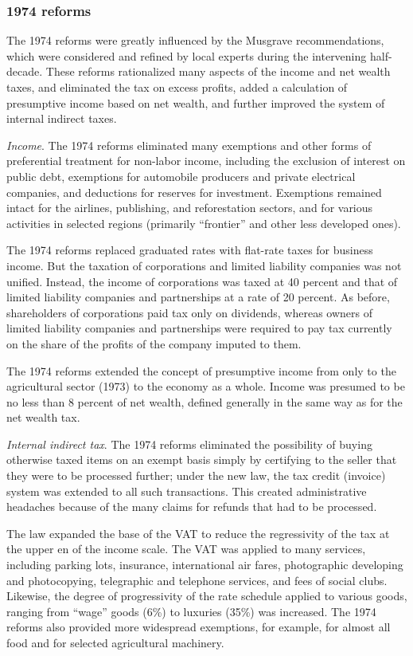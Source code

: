 \documentclass[
  12pt]{article}
\theoremstyle{definition}
\theoremstyle{remark}
\begin{document}
\subsubsection{1974 reforms}\label{reforms}

The 1974 reforms were greatly influenced by the Musgrave
recommendations, which were considered and refined by local experts
during the intervening half-decade. These reforms rationalized many
aspects of the income and net wealth taxes, and eliminated the tax on
excess profits, added a calculation of presumptive income based on net
wealth, and further improved the system of internal indirect taxes.

\emph{Income}. The 1974 reforms eliminated many exemptions and other
forms of preferential treatment for non-labor income, including the
exclusion of interest on public debt, exemptions for automobile
producers and private electrical companies, and deductions for reserves
for investment. Exemptions remained intact for the airlines, publishing,
and reforestation sectors, and for various activities in selected
regions (primarily ``frontier'' and other less developed ones).

The 1974 reforms replaced graduated rates with flat-rate taxes for
business income. But the taxation of corporations and limited liability
companies was not unified. Instead, the income of corporations was taxed
at 40 percent and that of limited liability companies and partnerships
at a rate of 20 percent. As before, shareholders of corporations paid
tax only on dividends, whereas owners of limited liability companies and
partnerships were required to pay tax currently on the share of the
profits of the company imputed to them.

The 1974 reforms extended the concept of presumptive income from only to
the agricultural sector (1973) to the economy as a whole. Income was
presumed to be no less than 8 percent of net wealth, defined generally
in the same way as for the net wealth tax.

\emph{Internal indirect tax}. The 1974 reforms eliminated the
possibility of buying otherwise taxed items on an exempt basis simply by
certifying to the seller that they were to be processed further; under
the new law, the tax credit (invoice) system was extended to all such
transactions. This created administrative headaches because of the many
claims for refunds that had to be processed.

The law expanded the base of the VAT to reduce the regressivity of the
tax at the upper en of the income scale. The VAT was applied to many
services, including parking lots, insurance, international air fares,
photographic developing and photocopying, telegraphic and telephone
services, and fees of social clubs. Likewise, the degree of
progressivity of the rate schedule applied to various goods, ranging
from ``wage'' goods (6\%) to luxuries (35\%) was increased. The 1974
reforms also provided more widespread exemptions, for example, for
almost all food and for selected agricultural machinery.
\end{document}
